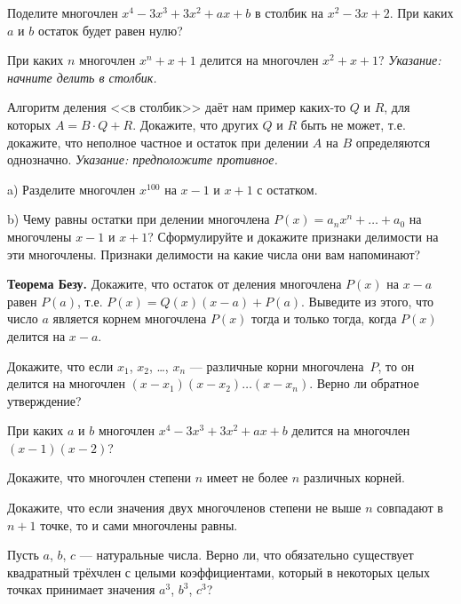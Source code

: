 \documentclass{article}
\begin{document}
    \begin{enumerate_boxed}

        \item Поделите многочлен $x^4-3x^3+3x^2+ax+b$ в столбик на $x^2-3x+2$.
        При каких $a$
        и $b$ остаток будет равен нулю?

        \item При каких $n$ многочлен $x^n+x+1$ делится на многочлен $x^2+x+1$? \textit{Указание: начните
        делить в столбик.}

        \item Алгоритм деления <<в столбик>> даёт нам пример каких-то $Q$ и $R$, для которых
        $A=B\cdot Q+R$.
        Докажите, что других $Q$ и $R$ быть не может, т.е. докажите, что
        неполное частное и остаток при делении $A$ на $B$ определяются однозначно. \textit{Указание:
        предположите противное.}

        \item  a) Разделите многочлен $x^{100}$ на $x-1$ и $x+1$ с остатком.

        b) Чему равны остатки при делении многочлена $P(x)=a_{n}x^n+\ldots+a_0$
        на многочлены $x-1$ и $x+1$? Сформулируйте и докажите признаки делимости на эти многочлены.
        Признаки делимости на какие числа они вам напоминают?

        \item \textbf {Теорема Безу.} Докажите, что остаток от деления многочлена $P(x)$ на $x-a$ равен $P(a)$,
        т.е. $P(x)=Q(x)(x-a)+P(a)$.
        Выведите из этого, что число $a$ является корнем многочлена $P(x)$
        тогда и только тогда, когда $P(x)$ делится на $x-a$.

        \item Докажите, что если $x_1$, $x_2$, \ldots, $x_n$ --- различные корни многочлена~$P$,
        то он делится на многочлен $(x-x_1)(x-x_2)\ldots (x-x_n)$.
        Верно ли обратное утверждение?

        \item При каких $a$ и $b$ многочлен $x^4-3x^3+3x^2+ax+b$  делится на многочлен $(x-1)(x-2)$?

        \item Докажите, что многочлен степени $n$ имеет не более $n$ различных корней.

        \item Докажите, что если значения двух многочленов степени не выше $n$ совпадают в $n+1$ точке, то и сами многочлены равны.

        \item Пусть $a$, $b$, $c$ --- натуральные числа.
        Верно ли, что обязательно существует квадратный трёхчлен с целыми коэффициентами, который в некоторых целых точках принимает значения $a^3$, $b^3$, $c^3$?


    \end{enumerate_boxed}
\end{document}
